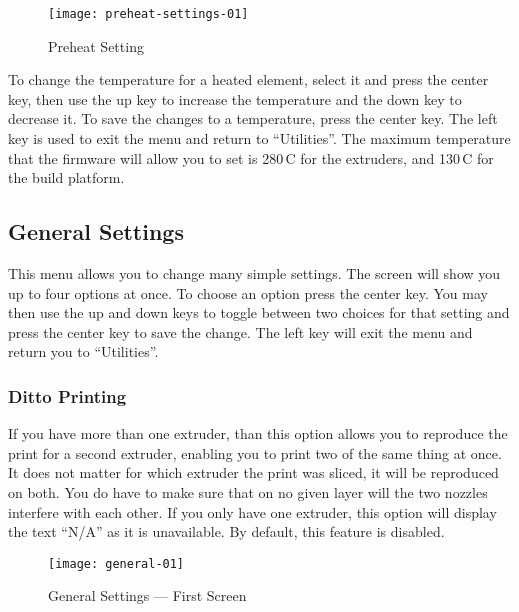  \begin{figure}[!htbp]
  \centering
    \texttt{[image: preheat-settings-01]}
    \caption{Preheat Setting}
  \label{fig:preset}
\end{figure}

To change the temperature for a heated element, select it and press the center key, then use the up key to increase the temperature and the down key to decrease it.  To save the changes to a temperature, press the center key.  The left key is used to exit the menu and return to ``Utilities''.  The maximum temperature that the firmware will allow you to set is 280\textdegree\,C for the extruders, and 130\textdegree\,C for the build platform.


\subsection{General Settings} \label{sec:general}

This menu allows you to change many simple settings.  The screen will show you up to four options at once.  To choose an option press the center key.  You may then use the up and down keys to toggle between two choices for that setting and press the center key to save the change.  The left key will exit the menu and return you to ``Utilities''.


\subsubsection{Ditto Printing} \label{sec:ditto}

If you have more than one extruder, than this option allows you to reproduce the print for a second extruder, enabling you to print two of the same thing at once.  It does not matter for which extruder the print was sliced, it will be reproduced on both.  You do have to make sure that on no given layer will the two nozzles interfere with each other.  If you only have one extruder, this option will display the text ``N/A'' as it is unavailable.  By default, this feature is disabled. %

 \begin{figure}[!htbp]
  \centering
    \texttt{[image: general-01]}
    \caption{General Settings --- First Screen}
  \label{fig:genfirst}
\end{figure}


